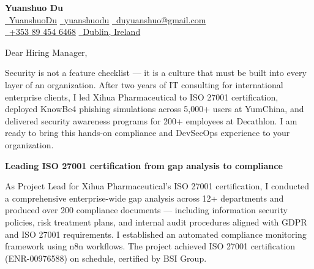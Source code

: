 \documentclass{coverletter}
\begin{document}
\begin{center}
  {\Large\sffamily\bfseries\color{namecolor} Yuanshuo Du}\\[0.12cm]
  {\sffamily\small
    \href{https://github.com/YuanshuoDu}{\color{accent}\faGithub\color{muted}\ YuanshuoDu}
    \quad\textbullet\quad
    \href{https://linkedin.com/in/yuanshuodu}{\color{accent}\faLinkedin\color{muted}\ yuanshuodu}
    \quad\textbullet\quad
    \href{https://mail.google.com/mail/?view=cm&to=duyuanshuo@gmail.com}{\color{accent}\faEnvelope\color{muted}\ duyuanshuo@gmail.com}
  }\\[0.06cm]
  {\sffamily\small\color{muted}
    \href{tel:+353894546468}{\color{accent}\faPhone\color{muted}\ +353 89 454 6468}
    \quad\textbullet\quad
    \href{https://www.google.com/maps/place/Dublin,+Ireland}{\color{accent}\faMapMarker\color{muted}\ Dublin, Ireland}
  }
\end{center}
\clrule
\noindent%
{\color{secondary}\sffamily\small
  Dear Hiring Manager,
}

\vspace{0.25cm}

\noindent%
{\color{secondary}\sffamily\small
  Security is not a feature checklist — it is a culture that must be built into every layer of an organization. After two years of IT consulting for international enterprise clients, I led Xihua Pharmaceutical to ISO 27001 certification, deployed KnowBe4 phishing simulations across 5,000+ users at YumChina, and delivered security awareness programs for 200+ employees at Decathlon. I am ready to bring this hands-on compliance and DevSecOps experience to your organization.
}

\vspace{0.35cm}

\noindent%
{\color{secondary}\sffamily\small\bfseries
  Leading ISO 27001 certification from gap analysis to compliance
}

\vspace{0.20cm}

\noindent%
{\color{secondary}\sffamily\small
  As Project Lead for Xihua Pharmaceutical's ISO 27001 certification, I conducted a comprehensive enterprise-wide gap analysis across 12+ departments and produced over 200 compliance documents — including information security policies, risk treatment plans, and internal audit procedures aligned with GDPR and ISO 27001 requirements. I established an automated compliance monitoring framework using n8n workflows. The project achieved ISO 27001 certification (ENR-00976588) on schedule, certified by BSI Group.
}
\end{document}
